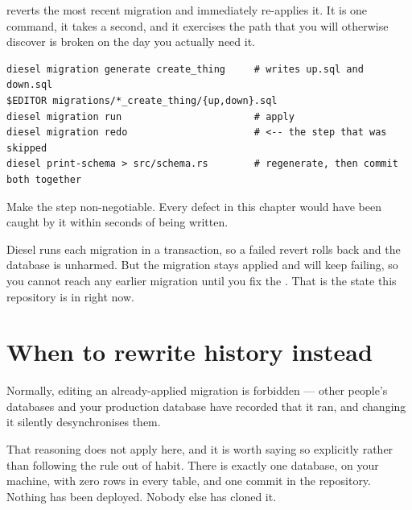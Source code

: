 \begin{pattern}
 reverts the most recent migration and immediately re-applies it. It is
one command, it takes a second, and it exercises the  path that you will otherwise
discover is broken on the day you actually need it.
\begin{lstlisting}[style=sh]
diesel migration generate create_thing     # writes up.sql and down.sql
$EDITOR migrations/*_create_thing/{up,down}.sql
diesel migration run                       # apply
diesel migration redo                      # <-- the step that was skipped
diesel print-schema > src/schema.rs        # regenerate, then commit both together
\end{lstlisting}
Make the  step non-negotiable. Every defect in this chapter would have been caught by it
within seconds of being written.
\end{pattern}

\begin{pitfall}
Diesel runs each migration in a transaction, so a failed revert rolls back and the database is
unharmed. But the migration stays applied and  will keep failing, so you cannot reach
any earlier migration until you fix the . That is the state this repository is in
right now.
\end{pitfall}

\section{When to rewrite history instead}
\label{sec:rewrite}

Normally, editing an already-applied migration is forbidden --- other people's databases and your
production database have recorded that it ran, and changing it silently desynchronises them.

That reasoning does not apply here, and it is worth saying so explicitly rather than following the
rule out of habit. There is exactly one database, on your machine, with zero rows in every table,
and one commit in the repository. Nothing has been deployed. Nobody else has cloned it.

